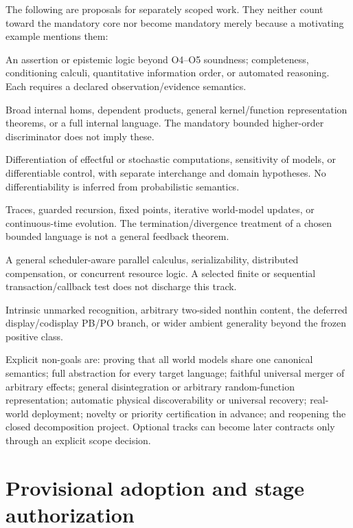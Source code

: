 \documentclass[11pt,a4paper]{article}
\begin{document}
The following are proposals for separately scoped work. They neither count
toward the mandatory core nor become mandatory merely because a motivating
example mentions them:
\begin{description}[style=nextline]
\item[Rich logic and inference.]
An assertion or epistemic logic beyond O4--O5 soundness; completeness,
conditioning calculi, quantitative information order, or automated reasoning.
Each requires a declared observation/evidence semantics.
\item[Closed and dependent higher-order structure.]
Broad internal homs, dependent products, general kernel/function
representation theorems, or a full internal language. The mandatory bounded
higher-order discriminator does not imply these.
\item[Differential structure.]
Differentiation of effectful or stochastic computations, sensitivity of
models, or differentiable control, with separate interchange and domain
hypotheses. No differentiability is inferred from probabilistic semantics.
\item[Feedback and recursion.]
Traces, guarded recursion, fixed points, iterative world-model updates, or
continuous-time evolution. The termination/divergence treatment of a chosen
bounded language is not a general feedback theorem.
\item[Concurrency and transactions.]
A general scheduler-aware parallel calculus, serializability, distributed
compensation, or concurrent resource logic. A selected finite or sequential
transaction/callback test does not discharge this track.
\item[Additional structural recognition.]
Intrinsic unmarked recognition, arbitrary two-sided nonthin content,
the deferred display/codisplay PB/PO branch, or wider ambient generality
beyond the frozen positive class.
\end{description}

Explicit non-goals are: proving that all world models share one canonical
semantics; full abstraction for every target language; faithful universal
merger of arbitrary effects; general disintegration or arbitrary random-function
representation; automatic physical discoverability or universal recovery;
real-world deployment; novelty or priority certification in advance; and
reopening the closed decomposition project. Optional tracks can become later
contracts only through an explicit scope decision.

\section*{Provisional adoption and stage authorization}
\end{document}

